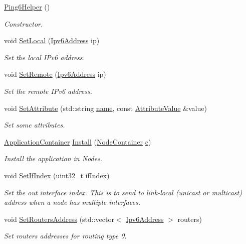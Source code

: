 \begin{DoxyCompactItemize}
\item 
\hyperlink{classns3_1_1Ping6Helper_abf0f36f64a213df907cc6bc8b30eb5b7}{Ping6\+Helper} ()
\begin{DoxyCompactList}\small\item\em Constructor. \end{DoxyCompactList}\item 
void \hyperlink{classns3_1_1Ping6Helper_aa1453d2ea29e762a3ae161a8099192e2}{Set\+Local} (\hyperlink{classns3_1_1Ipv6Address}{Ipv6\+Address} ip)
\begin{DoxyCompactList}\small\item\em Set the local I\+Pv6 address. \end{DoxyCompactList}\item 
void \hyperlink{classns3_1_1Ping6Helper_a1a2aaa6931daf3c493ceae3138f26072}{Set\+Remote} (\hyperlink{classns3_1_1Ipv6Address}{Ipv6\+Address} ip)
\begin{DoxyCompactList}\small\item\em Set the remote I\+Pv6 address. \end{DoxyCompactList}\item 
void \hyperlink{classns3_1_1Ping6Helper_aa049dde33bc4f712b7bf79e16da1243e}{Set\+Attribute} (std\+::string \hyperlink{generate__test__data__lte__spectrum__model_8m_ab74e6bf80237ddc4109968cedc58c151}{name}, const \hyperlink{classns3_1_1AttributeValue}{Attribute\+Value} \&value)
\begin{DoxyCompactList}\small\item\em Set some attributes. \end{DoxyCompactList}\item 
\hyperlink{classns3_1_1ApplicationContainer}{Application\+Container} \hyperlink{classns3_1_1Ping6Helper_a3f450b54b353b5181dec6c6d69733e0a}{Install} (\hyperlink{classns3_1_1NodeContainer}{Node\+Container} \hyperlink{mmwave_2model_2fading-traces_2fading__trace__generator_8m_ae0323a9039add2978bf5b49550572c7c}{c})
\begin{DoxyCompactList}\small\item\em Install the application in Nodes. \end{DoxyCompactList}\item 
void \hyperlink{classns3_1_1Ping6Helper_ad2e3e81dfa6ac241b813bca2145d48ad}{Set\+If\+Index} (uint32\+\_\+t if\+Index)
\begin{DoxyCompactList}\small\item\em Set the out interface index. This is to send to link-\/local (unicast or multicast) address when a node has multiple interfaces. \end{DoxyCompactList}\item 
void \hyperlink{classns3_1_1Ping6Helper_a7978c47a6c7e345979a80f4cff1b0519}{Set\+Routers\+Address} (std\+::vector$<$ \hyperlink{classns3_1_1Ipv6Address}{Ipv6\+Address} $>$ routers)
\begin{DoxyCompactList}\small\item\em Set routers addresses for routing type 0. \end{DoxyCompactList}\end{DoxyCompactItemize}
